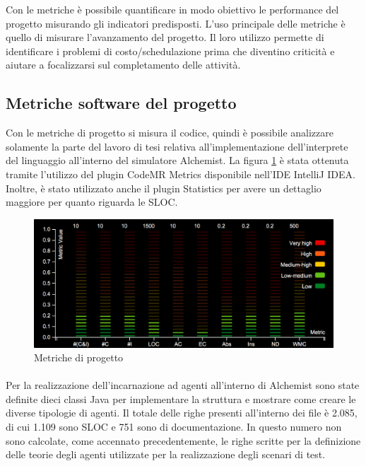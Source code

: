 Con le metriche è possibile quantificare in modo obiettivo le performance del progetto misurando gli indicatori predisposti. L'uso principale delle metriche è quello di misurare l'avanzamento del progetto. Il loro utilizzo permette di identificare i problemi di costo/schedulazione prima che diventino criticità e aiutare a focalizzarsi sul completamento delle attività.

\subsection{Metriche software del progetto}
Con le metriche di progetto si misura il codice, quindi è possibile analizzare solamente la parte del lavoro di tesi relativa all'implementazione dell'interprete del linguaggio all'interno del simulatore Alchemist.
La figura \ref{fig:codeMetrics} è stata ottenuta tramite l'utilizzo del plugin CodeMR Metrics disponibile nell'IDE IntelliJ IDEA. Inoltre, è stato utilizzato anche il plugin Statistics per avere un dettaglio maggiore per quanto riguarda le SLOC.
\begin{figure} %
\begin{center} %
\includegraphics[width=13cm]{images/codeMetrics.png} %
\caption[Metriche di progetto]{Metriche di progetto} \label{fig:codeMetrics}
\end{center}
\end{figure}

\paragraph*{}
Per la realizzazione dell'incarnazione ad agenti all'interno di Alchemist sono state definite dieci classi Java per implementare la struttura e mostrare come creare le diverse tipologie di agenti. Il totale delle righe presenti all'interno dei file è 2.085, di cui 1.109 sono SLOC e 751 sono di documentazione.
In questo numero non sono calcolate, come accennato precedentemente, le righe scritte per la definizione delle teorie degli agenti utilizzate per la realizzazione degli scenari di test.

